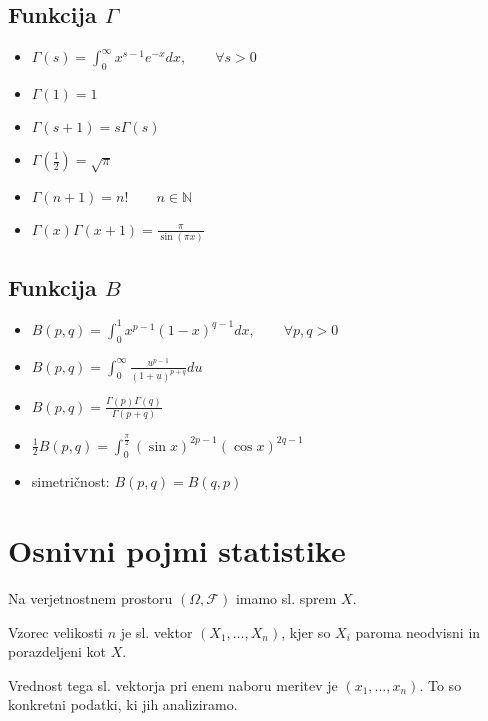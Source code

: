 \begin{multicols}{5}
\subsection*{Funkcija $\Gamma$}
\begin{itemize}
    \item $ \Gamma(s) = \int_0^{\infty} x^{s-1} e^{-x} dx, \qquad \forall s > 0 $
    \item $\Gamma(1) = 1$
    \item $\Gamma(s+1) = s \Gamma(s)$
    \item $\Gamma(\frac{1}{2}) = \sqrt{\pi}$
    \item $\Gamma(n+1) = n!\qquad n\in \mathbb{N}$
    \item $\Gamma(x)\Gamma(x+1) = \frac{\pi}{\sin(\pi x)}$
\end{itemize}

\subsection*{Funkcija $B$}
\begin{itemize}
    \item $B(p,q) = \int_0^1 x^{p-1} (1-x)^{q-1} dx, \qquad \forall p,q > 0$
    \item $\displaystyle B(p,q) = \int_0^{\infty} \frac{u^{p-1}}{(1+u)^{p+q}}du $
    \item $\displaystyle B(p,q) = \frac{\Gamma(p) \Gamma(q)}{\Gamma(p+q)}$
    \item $\frac{1}{2} B(p,q) = \displaystyle \int_0^{\frac{\pi}{2}} (\sin x)^{2p-1} (\cos x)^{2q-1}$
    \item simetričnost: $B(p,q) = B(q,p)$
\end{itemize}




\section{Osnivni pojmi statistike}
Na verjetnostnem prostoru $(\Omega, \mathcal{F})$ imamo sl. sprem $X$.

Vzorec velikosti $n$ je sl. vektor $(X_1, \dots, X_n)$, kjer so $X_i$ paroma neodvisni in porazdeljeni kot $X$.

Vrednost tega sl. vektorja pri enem naboru meritev je $(x_1, \dots, x_n)$. To so konkretni podatki, ki jih analiziramo.


\end{multicols}
